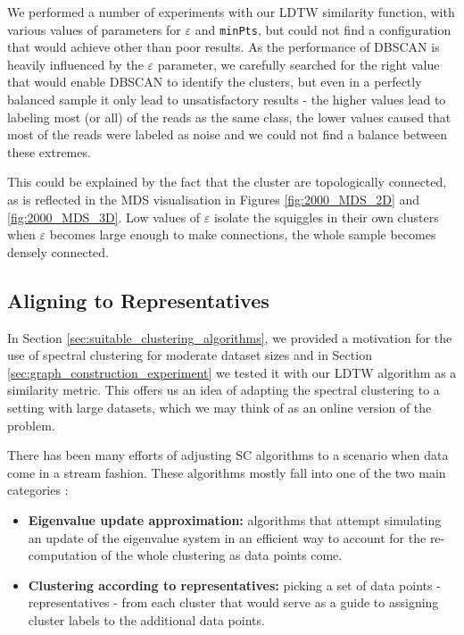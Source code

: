 We performed a number of experiments with our LDTW similarity function, with various values of parameters for $\varepsilon$ and \texttt{minPts}, but could not find a configuration that would achieve other than poor results. As the performance of DBSCAN is heavily influenced by the $\varepsilon$ parameter, we carefully searched for the right value that would enable DBSCAN to identify the clusters, but even in a perfectly balanced sample it only lead to unsatisfactory results - the higher values lead to labeling most (or all) of the reads as the same class, the lower values caused that most of the reads were labeled as noise and we could not find a balance between these extremes.

This could be explained by the fact that the cluster are topologically connected, as is reflected in the MDS visualisation in Figures \ref{fig:2000_MDS_2D} and \ref{fig:2000_MDS_3D}. Low values of $\varepsilon$ isolate the squiggles in their own clusters when $\varepsilon$ becomes large enough to make connections, the whole sample becomes densely connected.

\subsection{Aligning to Representatives}
In Section \ref{sec:suitable_clustering_algorithms}, we provided a motivation for the use of spectral clustering for moderate dataset sizes and in Section \ref{sec:graph_construction_experiment} we tested it with our LDTW algorithm as a similarity metric. This offers us an idea of adapting the spectral clustering to a setting with large datasets, which we may think of as an online version of the problem.

There has been many efforts of adjusting SC algorithms to a scenario when data come in a stream fashion. These algorithms mostly fall into one of the two main categories \cite{kong2011fast}: 

\begin{itemize}
    \item \textbf{Eigenvalue update approximation:} algorithms that attempt simulating an update of the eigenvalue system in an efficient way to account for the re-computation of the whole clustering as data points come.
    \item \textbf{Clustering according to representatives:} picking a set of data points - representatives - from each cluster that would serve as a guide to assigning cluster labels to the additional data points.
\end{itemize}

